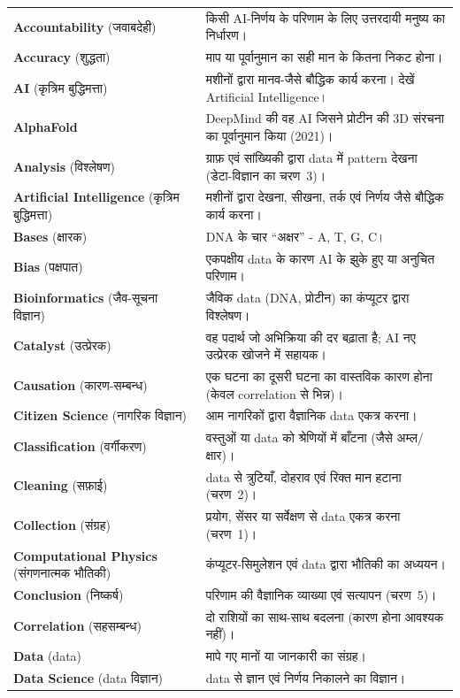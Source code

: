 \begin{longtable}{@{}p{5.2cm} p{8.3cm}@{}}
\textbf{Accountability} (जवाबदेही) & किसी AI-निर्णय के परिणाम के लिए उत्तरदायी मनुष्य का निर्धारण। \\
\textbf{Accuracy} (शुद्धता) & माप या पूर्वानुमान का सही मान के कितना निकट होना। \\
\textbf{AI} (कृत्रिम बुद्धिमत्ता) & मशीनों द्वारा मानव-जैसे बौद्धिक कार्य करना। देखें Artificial Intelligence। \\
\textbf{AlphaFold} & DeepMind की वह AI जिसने प्रोटीन की 3D संरचना का पूर्वानुमान किया (2021)। \\
\textbf{Analysis} (विश्लेषण) & ग्राफ़ एवं सांख्यिकी द्वारा data में pattern देखना (डेटा-विज्ञान का चरण~3)। \\
\textbf{Artificial Intelligence} (कृत्रिम बुद्धिमत्ता) & मशीनों द्वारा देखना, सीखना, तर्क एवं निर्णय जैसे बौद्धिक कार्य करना। \\
\textbf{Bases} (क्षारक) & DNA के चार “अक्षर” - A, T, G, C। \\
\textbf{Bias} (पक्षपात) & एकपक्षीय data के कारण AI के झुके हुए या अनुचित परिणाम। \\
\textbf{Bioinformatics} (जैव-सूचना विज्ञान) & जैविक data (DNA, प्रोटीन) का कंप्यूटर द्वारा विश्लेषण। \\
\textbf{Catalyst} (उत्प्रेरक) & वह पदार्थ जो अभिक्रिया की दर बढ़ाता है; AI नए उत्प्रेरक खोजने में सहायक। \\
\textbf{Causation} (कारण-सम्बन्ध) & एक घटना का दूसरी घटना का वास्तविक कारण होना (केवल correlation से भिन्न)। \\
\textbf{Citizen Science} (नागरिक विज्ञान) & आम नागरिकों द्वारा वैज्ञानिक data एकत्र करना। \\
\textbf{Classification} (वर्गीकरण) & वस्तुओं या data को श्रेणियों में बाँटना (जैसे अम्ल/क्षार)। \\
\textbf{Cleaning} (सफ़ाई) & data से त्रुटियाँ, दोहराव एवं रिक्त मान हटाना (चरण~2)। \\
\textbf{Collection} (संग्रह) & प्रयोग, सेंसर या सर्वेक्षण से data एकत्र करना (चरण~1)। \\
\textbf{Computational Physics} (संगणनात्मक भौतिकी) & कंप्यूटर-सिमुलेशन एवं data द्वारा भौतिकी का अध्ययन। \\
\textbf{Conclusion} (निष्कर्ष) & परिणाम की वैज्ञानिक व्याख्या एवं सत्यापन (चरण~5)। \\
\textbf{Correlation} (सहसम्बन्ध) & दो राशियों का साथ-साथ बदलना (कारण होना आवश्यक नहीं)। \\
\textbf{Data} (data) & मापे गए मानों या जानकारी का संग्रह। \\
\textbf{Data Science} (data विज्ञान) & data से ज्ञान एवं निर्णय निकालने का विज्ञान। \\

\end{longtable}
